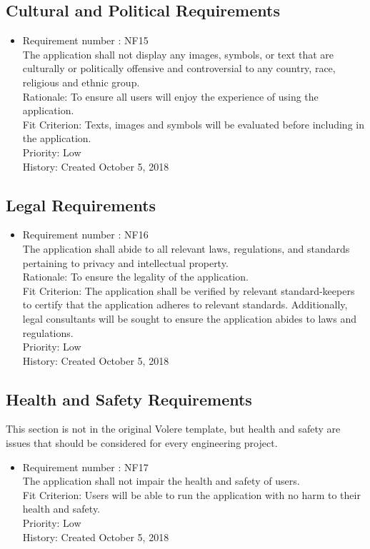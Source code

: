 \documentclass[12pt, titlepage]{article}
\begin{document}
\subsection{Cultural and Political Requirements}
\begin{itemize}
\item Requirement number : NF15\\
The application shall not display any images, symbols, or text that are culturally or politically offensive and controversial to any country, race, religious and ethnic group. \\
Rationale: To ensure all users will enjoy the experience of using the application. \\
Fit Criterion: Texts, images and symbols will be evaluated before including in  the application.   \\
Priority: Low\\
History: Created October 5, 2018

\end{itemize}
\subsection{Legal Requirements}
\begin{itemize}
\item Requirement number : NF16\\
The application shall abide to all relevant laws, regulations, and standards  pertaining to privacy and intellectual property.\\
Rationale: To ensure the legality of the application.\\
Fit Criterion:  The application shall be verified by relevant standard-keepers to certify that the application adheres to relevant standards. Additionally, legal consultants will be sought to ensure the application abides to laws and regulations. \\
Priority: Low\\
History: Created October 5, 2018

\end{itemize}

\subsection{Health and Safety Requirements}

This section is not in the original Volere template, but health and safety are
issues that should be considered for every engineering project.
\begin{itemize}
\item Requirement number : NF17\\
The application shall not impair the health and safety of users.\\
Fit Criterion:  Users will be able to run the application with no harm to their health and safety. \\
Priority: Low\\
History: Created October 5, 2018

\end{itemize}
\end{document}

